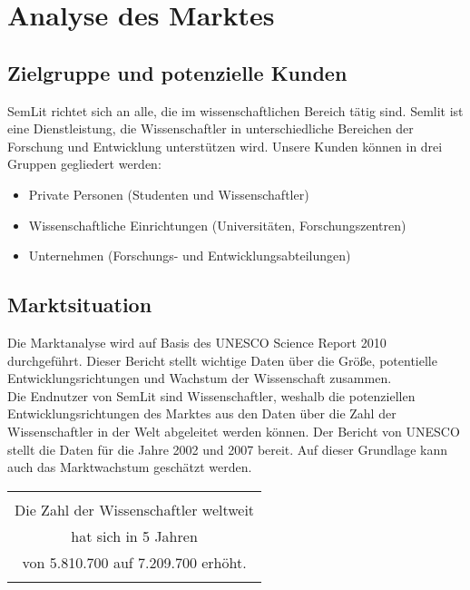 \section{Analyse des Marktes}


\subsection{Zielgruppe und potenzielle Kunden}
SemLit richtet sich an alle, die im wissenschaftlichen Bereich tätig sind. Semlit ist eine Dienstleistung, die Wissenschaftler in unterschiedliche Bereichen der Forschung und Entwicklung unterstützen wird. Unsere Kunden können in drei Gruppen gegliedert werden:
\begin{itemize}
\item Private Personen (Studenten und Wissenschaftler)

\item Wissenschaftliche Einrichtungen (Universitäten, Forschungszentren)

\item Unternehmen (Forschungs- und Entwicklungsabteilungen)
\end{itemize}

\subsection{Marktsituation}
Die Marktanalyse wird auf Basis des UNESCO Science Report 2010 durchgeführt. Dieser Bericht stellt wichtige Daten über die Größe, potentielle Entwicklungsrichtungen und Wachstum der Wissenschaft zusammen.\\
Die Endnutzer von SemLit sind Wissenschaftler, weshalb  die potenziellen Entwicklungsrichtungen des Marktes aus den Daten über die Zahl der Wissenschaftler in der Welt abgeleitet werden können. Der Bericht von UNESCO stellt die Daten für die Jahre 2002 und 2007 bereit. Auf dieser Grundlage kann auch das Marktwachstum geschätzt werden.\\

\begin{table}[h!]
  \centering
  \begin{large}
  \begin{tabular}{c}\hline
  \\
  {\color{orange}Die Zahl der Wissenschaftler weltweit}\\
  {\color{orange}hat sich in 5 Jahren }\\
  {\color{orange}von 5.810.700 auf 7.209.700 erhöht.}\\ 
  \\\hline
  \end{tabular}
  \end{large}
\end{table}

